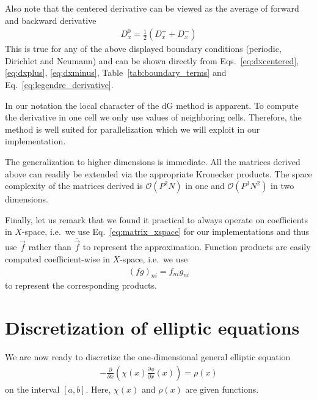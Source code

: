 Also note that the centered derivative can be viewed as the average of forward
and backward derivative
\begin{align}
    D^0_{x} = \frac{1}{2}\left( D^+_x + D^-_x\right)
\end{align}
This is true for any of the above displayed boundary conditions (periodic,
Dirichlet and Neumann) and can be shown directly from Eqs.~\eqref{eq:dxcentered},
\eqref{eq:dxplus}, \eqref{eq:dxminus}, Table~\eqref{tab:boundary_terms}
and Eq.~\eqref{eq:legendre_derivative}.

In our notation the local character of the dG method is apparent.
To compute the derivative in one cell we only use values of neighboring
cells. Therefore, the method is well suited for parallelization which we
will exploit in our implementation.

The generalization to higher dimensions is immediate.
All the
matrices derived above can readily be extended via the appropriate Kronecker products.
The space complexity of 
the matrices derived is $\mathcal{O}(P^2 N)$ in one and $\mathcal{O}(P^3N^2)$ in two dimensions.

Finally, let us remark that we found it practical to always operate on 
coefficients in $X$-space, i.e.~we use Eq.~\eqref{eq:matrix_xspace}
for our implementations and thus use $\vec f$ rather than $\bar{\vec f}$ to represent the approximation. Function products are easily computed coefficient-wise in $X$-space, i.e.~we use
\begin{align}
    (fg)_{ni}=f_{ni}g_{ni}
    \label{}
\end{align}
to represent the corresponding products.

\section{Discretization of elliptic equations} \label{sec:elliptic}
We are now ready to discretize the one-dimensional general elliptic equation 
\begin{align}
    -\frac{\partial}{\partial x}\left( \chi(x)\frac{\partial \phi}{\partial x}(x)\right) = \rho(x)
    \label{eq:elliptic}
\end{align}
on the interval $[a,b]$. Here, $\chi(x)$ and $\rho(x)$ are given functions.

